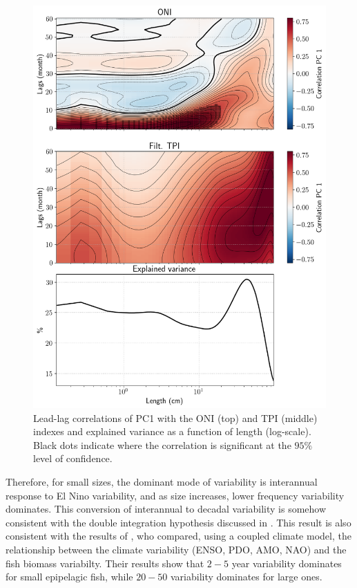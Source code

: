 \begin{figure}
    \centering
    \includegraphics[scale=0.5]{figs/correlations_eof_oni_tpi_eof_1.png}
    \caption{Lead-lag correlations of PC1 with the ONI (top) and TPI (middle) indexes and explained variance as a function of length (log-scale). Black dots indicate where the correlation is significant at the $95\%$ level of confidence.}
    \label{fig:pc_corrs}
\end{figure}

Therefore, for small sizes, the dominant mode of variability is interannual response to El Nino variability, and as size increases, lower frequency variability dominates. This conversion of interannual to decadal variability is somehow consistent with the double integration hypothesis discussed in \cite{lorenzoDoubleintegrationHypothesisExplain2013}. This result is also consistent with the results of \cite{lemezoNaturalVariabilityMarine2016}, who compared, using a coupled climate model, the relationship between the climate variability (ENSO, PDO, AMO, NAO) and the fish biomass variabilty. Their results show that $2-5$ year variability dominates for small epipelagic fish, while $20-50$ variability dominates for large ones.




